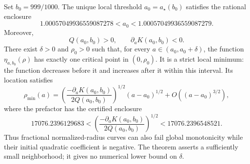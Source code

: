 \begin{theorem}
\label{rwloc:turn:thm:minimum}
Set $b_0=999/1000$. The unique local threshold $a_0=a_\star(b_0)$
satisfies the rational enclosure
\begin{equation}\label{rwloc:turn:eq:minbracket}
 1.00057049936559087278<a_0<1.00057049936559087279.
\end{equation}
Moreover,
\[
 Q(a_0,b_0)>0,\qquad \partial_a K(a_0,b_0)<0.
\]
There exist $\delta>0$ and $\rho_0>0$ such that, for every
$a\in(a_0,a_0+\delta)$, the function $\eta_{a,b_0}(\rho)$
has exactly one critical point in $(0,\rho_0)$. It is a strict local
minimum: the function decreases before it and increases after it
within this interval. Its location satisfies
\begin{equation}\label{rwloc:turn:eq:minimumscale}
 \rho_{\min}(a)
 =\left(\frac{-\partial_a K(a_0,b_0)}{2Q(a_0,b_0)}\right)^{1/2}
       (a-a_0)^{1/2}+O((a-a_0)^{3/2}),
\end{equation}
where the prefactor has the certified enclosure
\[
 17076.2396129683<
 \left(\frac{-\partial_a K(a_0,b_0)}{2Q(a_0,b_0)}\right)^{1/2}
 <17076.2396548521.
\]
Thus fractional normalized-radius curves can also fail global
monotonicity while their initial quadratic coefficient is negative.
The theorem asserts a sufficiently small neighborhood; it gives no
numerical lower bound on $\delta$.
\end{theorem}


